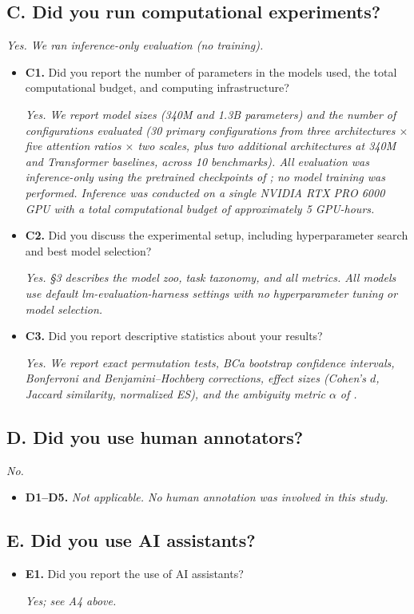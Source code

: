\subsection*{C. Did you run computational experiments?}

\textit{Yes. We ran inference-only evaluation (no training).}

\begin{itemize}
\item[\checkmark] \textbf{C1.} Did you report the number of parameters in the models used, the total computational budget, and computing infrastructure?

\textit{Yes. We report model sizes (340M and 1.3B parameters) and the number of configurations evaluated (30 primary configurations from three architectures $\times$ five attention ratios $\times$ two scales, plus two additional architectures at 340M and Transformer baselines, across 10 benchmarks). All evaluation was inference-only using the pretrained checkpoints of \citet{wang2025hybrid}; no model training was performed. Inference was conducted on a single NVIDIA RTX PRO 6000 GPU with a total computational budget of approximately 5 GPU-hours.}

\item[\checkmark] \textbf{C2.} Did you discuss the experimental setup, including hyperparameter search and best model selection?

\textit{Yes. \S3 describes the model zoo, task taxonomy, and all metrics. All models use default lm-evaluation-harness settings with no hyperparameter tuning or model selection.}

\item[\checkmark] \textbf{C3.} Did you report descriptive statistics about your results?

\textit{Yes. We report exact permutation tests, BCa bootstrap confidence intervals, Bonferroni and Benjamini--Hochberg corrections, effect sizes (Cohen's $d$, Jaccard similarity, normalized ES), and the ambiguity metric $\alpha$ of \citet{marx2020predictive}.}
\end{itemize}

\subsection*{D. Did you use human annotators?}

\textit{No.}

\begin{itemize}
\item[N/A] \textbf{D1--D5.} \textit{Not applicable. No human annotation was involved in this study.}
\end{itemize}

\subsection*{E. Did you use AI assistants?}

\begin{itemize}
\item[\checkmark] \textbf{E1.} Did you report the use of AI assistants?

\textit{Yes; see A4 above.}
\end{itemize}
